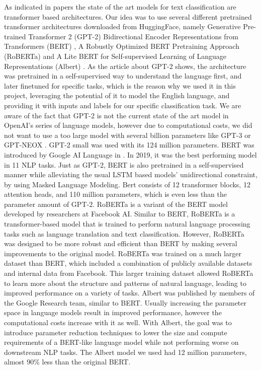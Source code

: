 \documentclass[runningheads]{llncs}
\begin{document}
As indicated in papers \cite{DL_text_class} \cite{MBTI_class} the state of the art models for text classification are transformer based architectures. Our idea was to use several different pretrained transformer architectures downloaded from HuggingFace, namely Generative Pre-trained Transformer 2 (GPT-2) \cite{gpt2} Bidirectional Encoder Representations from Transformers (BERT) \cite{bert}, A Robustly Optimized BERT Pretraining Approach (RoBERTa) \cite{roBERTa} and A Lite BERT for Self-supervised Learning of Language Representations (Albert) \cite{Albert}.
\newline
As the article about GPT-2 \cite{gpt2} shows, the architecture was pretrained in a self-supervised way to understand the language first, and later finetuned for specific tasks, which is the reason why we used it in this project, leveraging the potential of it to model the English language, and providing it with inputs and labels for our specific classification task. We are aware of the fact that GPT-2 is not the current state of the art model in OpenAI's series of language models, however due to computational costs, we did not want to use a too large model with several billion parameters like GPT-3 \cite{gpt-3} or GPT-NEOX \cite{gpt-neox}. GPT-2 small was used with its 124 million parameters.
\newline
BERT was introduced by Google AI Language in \cite{bert}. In 2019, it was the best performing model in 11 NLP tasks.
Just as GPT-2, BERT is also pretrained in a self-supervised manner while alleviating the usual LSTM based models' unidirectional constraint, by using Masked Language Modeling. Bert consists of 12 transformer blocks, 12 attention heads, and 110 million parameters, which is even less than the parameter amount of GPT-2.
\newline
RoBERTa \cite{roBERTa} is a variant of the BERT model developed by researchers at Facebook AI. Similar to BERT, RoBERTa is a transformer-based model that is trained to perform natural language processing tasks such as language translation and text classification. However, RoBERTa was designed to be more robust and efficient than BERT by making several improvements to the original model. RoBERTa was trained on a much larger dataset than BERT, which included a combination of publicly available datasets and internal data from Facebook. This larger training dataset allowed RoBERTa to learn more about the structure and patterns of natural language, leading to improved performance on a variety of tasks.  
\newline
\newline
Albert \cite{Albert} was published by members of the Google Research team, similar to BERT. Usually increasing the parameter space in language models result in improved performance, however the computational costs increase with it as well. With Albert, the goal was to introduce parameter reduction techniques to lower the size and compute requirements of a BERT-like language model while not performing worse on downstream NLP tasks. The Albert model we used had 12 million parameters, almost 90\% less than the original BERT.
\end{document}
